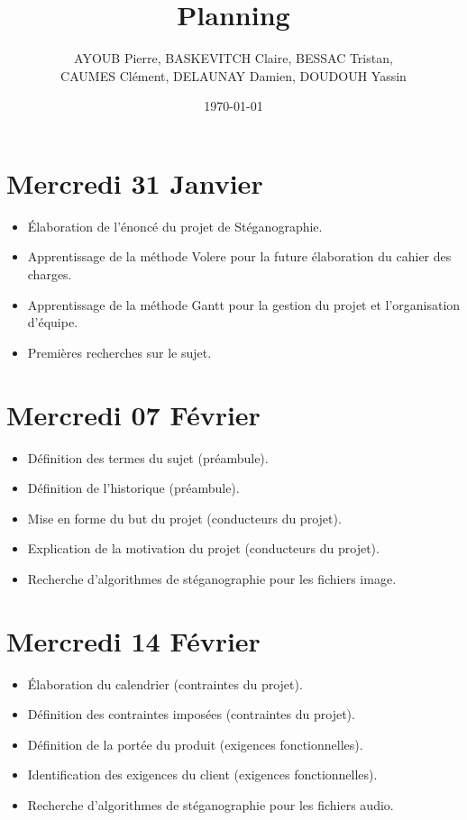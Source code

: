 \documentclass[11pt]{article}
\title{Planning}
\author{AYOUB Pierre, BASKEVITCH Claire, BESSAC Tristan, \\
CAUMES Clément, DELAUNAY Damien, DOUDOUH Yassin}
\date\today
\begin{document}
\maketitle

\section{Mercredi 31 Janvier}
\begin {itemize}
\item Élaboration de l'énoncé du projet de Stéganographie.
\item Apprentissage de la méthode Volere pour la future élaboration du cahier des charges.
\item Apprentissage de la méthode Gantt pour la gestion du projet et l'organisation d'équipe.
\item Premières recherches sur le sujet.
\end{itemize}

\section{Mercredi 07 Février}
\begin {itemize}
\item Définition des termes du sujet (préambule).
\item Définition de l'historique (préambule).
\item Mise en forme du but du projet (conducteurs du projet).
\item Explication de la motivation du projet (conducteurs du projet).
\item Recherche d'algorithmes de stéganographie pour les fichiers image.
\end{itemize}

\section{Mercredi 14 Février}
\begin {itemize}
\item Élaboration du calendrier (contraintes du projet).
\item Définition des contraintes imposées (contraintes du projet).
\item Définition de la portée du produit (exigences fonctionnelles).
\item Identification des exigences du client (exigences fonctionnelles).
\item Recherche d'algorithmes de stéganographie pour les fichiers audio.
\end{itemize}
\end{document}
